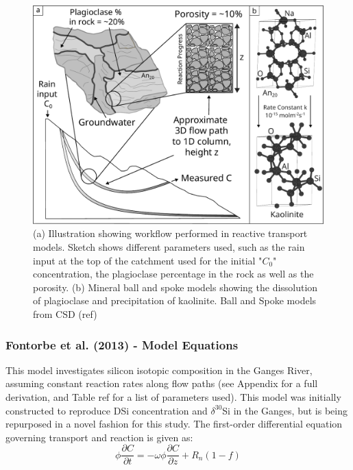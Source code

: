 \begin{figure}[h]
    \centering
    \includegraphics[width=\textwidth]{sketch.pdf}
    \caption{(a) Illustration showing workflow performed in reactive transport models. Sketch shows different parameters used, such as the rain input at the top of the catchment used for the initial "$C_0$" concentration, the plagioclase percentage in the rock as well as the porosity. (b) Mineral ball and spoke models showing the dissolution of plagioclase and precipitation of kaolinite. Ball and Spoke models from CSD (ref)}
    \label{fig:reactsketch}
\end{figure}

\FloatBarrier

\newpage

\subsubsection*{Fontorbe et al. (2013) - Model Equations}

This model investigates silicon isotopic composition in the Ganges River, assuming constant reaction rates along flow paths (see Appendix for a full derivation, and Table ref for a list of parameters used). This model was initially constructed to reproduce DSi concentration and $\delta^{30}$Si in the Ganges, but is being repurposed in a novel fashion for this study. The first-order differential equation governing transport and reaction is given as:\\

    \begin{equation}
    \phi \frac{\partial C}{\partial t} = -\omega \phi \frac{\partial C}{\partial z} + R_n(1-f)
    \end{equation}\\

